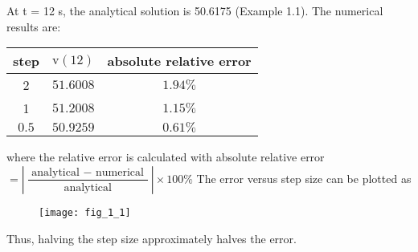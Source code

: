 \documentclass[../main.tex]{subfiles}
\begin{document}
\section{ }
At t = 12 s, the analytical solution is 50.6175 (Example 1.1). The numerical results are:
\bigbreak
	\begin{tabular}{|c|c|c|}
		\hline
		step & $\mathrm{v}(12)$ & absolute relative error \\
		\hline
		2 & $51.6008$ & $1.94 \%$ \\
		\hline
		1 & $51.2008$ & $1.15 \%$ \\
		\hline
		$0.5$ & $50.9259$ & $0.61 \%$ \\
		\hline
	\end{tabular}
	\bigbreak
where the relative error is calculated with
	\bigbreak
absolute relative error $=\left|\dfrac{\text { analytical }-\text { numerical }}{\text { analytical }}\right| \times 100 \%$
	\bigbreak
The error versus step size can be plotted as
	\bigbreak
	\begin{figure}[H]
		\hspace{1cm}\texttt{[image: fig\_1\_1]}
		\label{fig:fig_1_1}
	\end{figure}
	\bigbreak
Thus, halving the step size approximately halves the error.
	\bigbreak

\section{ }
\end{document}
